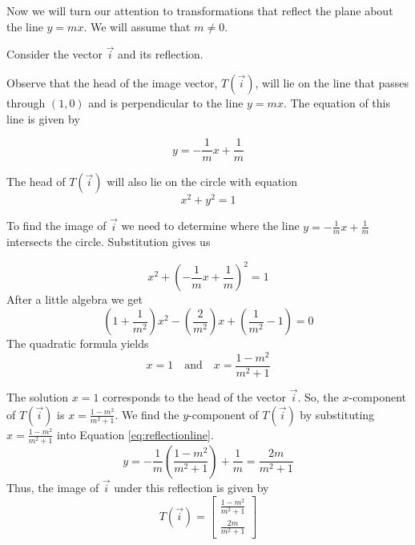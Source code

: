 \documentclass{ximera}
\begin{document}
  Now we will turn our attention to transformations that reflect the plane about the line $y=mx$.  We will assume that $m\neq 0$.
  
  Consider the vector $\vec{i}$ and its reflection. 
\begin{center}
  \end{center}

   
   
   
   Observe that the head of the image vector, $T(\vec{i})$, will lie on the line that passes through $(1,0)$ and is perpendicular to the line $y=mx$.  The equation of this line is given by
   
   \begin{equation}\label{eq:reflectionline} 
   y=-\frac{1}{m}x+\frac{1}{m}
   \end{equation}
   
 The head of $T(\vec{i})$ will also lie on the circle with equation
   $$x^2+y^2=1$$
   
   
   To find the image of $\vec{i}$ we need to determine where the line  $y=-\frac{1}{m}x+\frac{1}{m}$ intersects the circle.  Substitution gives us
   
   $$x^2+\left(-\frac{1}{m}x+\frac{1}{m}\right)^2=1$$
   After a little algebra we get
   $$\left(1+\frac{1}{m^2}\right)x^2-\left(\frac{2}{m^2}\right)x+\left(\frac{1}{m^2}-1\right)=0$$
   The quadratic formula yields 
   $$x=1\quad\text{and}\quad x=\frac{1-m^2}{m^2+1}$$
   
   The solution $x=1$ corresponds to the head of the vector $\vec{i}$.  So, the $x$-component of $T(\vec{i})$ is $x=\frac{1-m^2}{m^2+1}$.  We find the $y$-component of $T(\vec{i})$ by
   substituting $x=\frac{1-m^2}{m^2+1}$ into Equation \ref{eq:reflectionline}.
   $$ y=-\frac{1}{m}\left(\frac{1-m^2}{m^2+1}\right)+\frac{1}{m}=\frac{2m}{m^2+1}$$
   Thus, the image of $\vec{i}$ under this reflection is given by
   $$T(\vec{i})=\begin{bmatrix}\frac{1-m^2}{m^2+1}\\\frac{2m}{m^2+1}\end{bmatrix}$$
   
\end{document}
